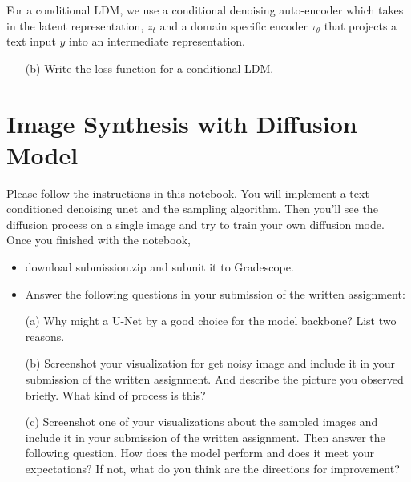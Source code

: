 \documentclass[a4paper]{article}
\begin{document}
For a conditional LDM, we use a conditional denoising auto-encoder which takes in the latent representation, \(z_t\) and a domain specific encoder \(\tau_{\theta}\) that projects a text input \(y\) into an intermediate representation.  
\begin{itemize}
    \item [(b)]
    Write the loss function for a conditional LDM.
   
\end{itemize}

\section{Image Synthesis with Diffusion Model}

Please follow the instructions in this \href{https://colab.research.google.com/drive/1e_3xj1uvOjlD5duraQedHFuYNaiMwm8X?usp=sharing}{notebook}. 
You will implement a text conditioned denoising unet and the sampling algorithm. Then you'll see the diffusion process on a single image and try to train your own diffusion mode. Once you finished with the notebook,
\begin{itemize}
    \item download submission.zip and submit it to Gradescope.

    \item Answer the following questions in your submission of the written assignment:
\end{itemize}

\begin{itemize}
    \item [(a)]
    Why might a U-Net by a good choice for the model backbone? List two reasons.


    \item [(b)]
    Screenshot your visualization for get noisy image and include it in your submission of the written assignment. And describe the picture you observed briefly. What kind of process is this?


    \item [(c)]
    Screenshot one of your visualizations about the sampled images and include it in your submission of the written assignment. Then answer the following question. How does the model perform and does it meet your expectations? If not, what do you think are the directions for improvement?

    
\end{itemize}
\end{document}
